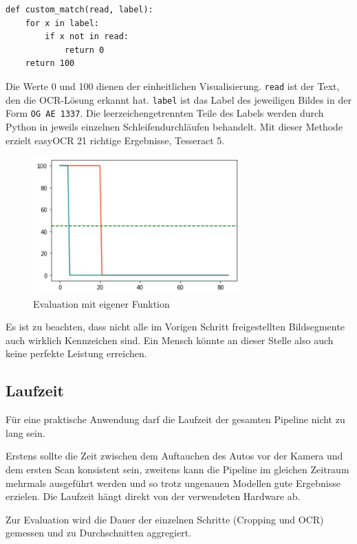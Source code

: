 \begin{lstlisting} 
def custom_match(read, label):	
    for x in label:
        if x not in read:
            return 0
    return 100
\end{lstlisting}     
Die Werte 0 und 100 dienen der einheitlichen Visualisierung. \lstinline{read} ist der Text, den die OCR-Lösung erkannt hat. \lstinline{label} ist das Label des jeweiligen Bildes in der Form \lstinline{OG AE 1337}. Die leerzeichengetrennten Teile des Labels werden durch Python in jeweils einzelnen Schleifendurchläufen behandelt.
Mit dieser Methode erzielt easyOCR 21 richtige Ergebnisse, Tesseract 5.
\begin{figure}[h]
	\includegraphics[width=8cm]{./img/evaluation_custom_matcher.svg}
	\caption{Evaluation mit eigener Funktion}
\end{figure}


Es ist zu beachten, dass nicht alle im Vorigen Schritt freigestellten Bildsegmente auch wirklich Kennzeichen sind. Ein Mensch könnte an dieser Stelle also auch keine perfekte Leistung erreichen. 

\subsection{Laufzeit}

Für eine praktische Anwendung darf die Laufzeit der gesamten Pipeline nicht zu lang sein.

Erstens sollte die Zeit zwischen dem Auftauchen des Autos vor der Kamera und dem ersten Scan konsistent sein,
zweitens kann die Pipeline im gleichen Zeitraum mehrmals ausgeführt werden und so trotz ungenauen Modellen gute Ergebnisse erzielen.
Die Laufzeit hängt direkt von der verwendeten Hardware ab.

Zur Evaluation wird die Dauer der einzelnen Schritte (Cropping und OCR) gemessen und zu Durchschnitten aggregiert. 

